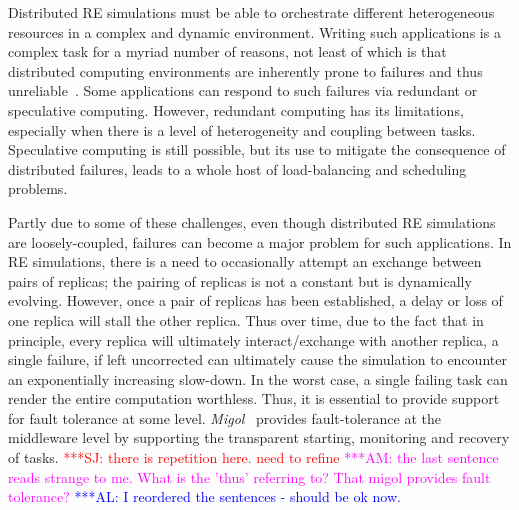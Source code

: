 \documentclass{rspublic}
\newcommand{\alnote}[1]{ {\textcolor{blue} { ***AL: #1 }}}
\newcommand{\amnote}[1]{ {\textcolor{magenta} { ***AM: #1 }}}
\newcommand{\jhanote}[1]{ {\textcolor{red} { ***SJ: #1 }}}
\newcommand{\alnote}[1]{}
\newcommand{\amnote}[1]{}
\newcommand{\jhanote}[1]{}
\begin{document}


Distributed RE simulations must be able to orchestrate different
heterogeneous resources in a complex and dynamic environment.  Writing
such applications is a complex task for a myriad number of reasons,
not least of which is that distributed computing environments are
inherently prone to failures and thus
unreliable~\cite{schroeder,10.1109/E-SCIENCE.2006.93,DBLP:conf/grid/KhaliliHOSC06}.
Some applications can respond to such failures via redundant or
speculative computing.  However, redundant computing has its
limitations, especially when there is a level of heterogeneity and
coupling between tasks.  Speculative computing is still possible, but
its use to mitigate the consequence of distributed failures, leads to
a whole host of load-balancing and scheduling problems.


Partly due to some of these challenges, even though distributed RE
simulations are loosely-coupled, failures can become a major problem
for such applications.  In RE simulations, there is a need to
occasionally attempt an exchange between pairs of replicas; the
pairing of replicas is not a constant but is dynamically evolving.
However, once a pair of replicas has been established, a delay or loss
of one replica will stall the other replica.  Thus over time, due to
the fact that in principle, every replica will ultimately
interact/exchange with another replica, a single failure, if left
uncorrected can ultimately cause the simulation to encounter an
exponentially increasing slow-down.  In the worst case, a single
failing task can render the entire computation worthless.  Thus, it is
essential to provide support for fault tolerance at some level.
\emph{Migol}~\cite{schnorLuckow08} provides fault-tolerance at the
middleware level by supporting the transparent starting, monitoring
and recovery of tasks.
\jhanote{there is repetition here. need to refine} \amnote{the last
  sentence reads strange to me.  What is the 'thus' referring to?  That
  migol provides fault tolerance?}      
\alnote{I reordered the sentences - should be ok now.}
\end{document}
